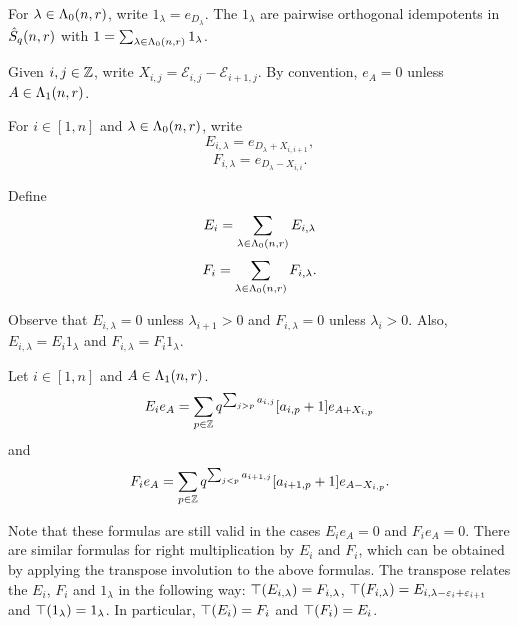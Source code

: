 \documentclass[a4paper, 11pt]{report}
\begin{document}
For $\lambda\in\Lambda_0(n,r)$, write $1_\lambda = e_{D_\lambda}$. The $1_\lambda$ are pairwise orthogonal idempotents in $\hat{S}_q(n,r)$ with $1 = \sum_{\lambda\in\Lambda_0(n,r)}1_\lambda$.

Given $i,j\in\mathbb{Z}$, write $X_{i,j} = \mathcal{E}_{i,j} - \mathcal{E}_{i+1,j}$. By convention, $e_A = 0$ unless $A\in\Lambda_1(n,r)$.

For $i\in [1,n]$ and $\lambda\in\Lambda_0(n,r)$, write
\begin{equation*}
E_{i,\lambda} = e_{D_\lambda + X_{i,i+1}},
\end{equation*}
\begin{equation*}
F_{i,\lambda} = e_{D_\lambda - X_{i,i}}.
\end{equation*}

Define
\begin{equation*}
E_i = \sum_{\lambda\in\Lambda_0(n,r)} E_{i,\lambda}
\end{equation*}
\begin{equation*}
F_i = \sum_{\lambda\in\Lambda_0(n,r)} F_{i,\lambda}.
\end{equation*}

Observe that $E_{i,\lambda}=0$ unless $\lambda_{i+1} > 0$ and $F_{i,\lambda}=0$ unless $\lambda_i > 0$. Also, $E_{i,\lambda} = E_i 1_\lambda$ and $F_{i,\lambda} = F_i 1_\lambda$. 
\begin{lemma}
Let $i\in [1,n]$ and $A\in\Lambda_1(n,r)$.
\begin{equation*}
E_ie_A = \sum_{p\in\mathbb{Z}} q^{\sum_{j>p} a_{i,j}}[a_{i,p}+1] e_{A + X_{i,p}}
\end{equation*}
and
\begin{equation*}                                                                               
F_ie_A = \sum_{p\in\mathbb{Z}} q^{\sum_{j<p} a_{i+1,j}}[a_{i+1,p}+1] e_{A - X_{i,p}}.
\end{equation*}
\end{lemma}

Note that these formulas are still valid in the cases $E_ie_A=0$ and $F_ie_A=0$. There are similar formulas for right multiplication by $E_i$ and $F_i$, which can be obtained by applying the transpose involution to the above formulas. The transpose relates the $E_i$, $F_i$ and $1_\lambda$ in the following way: $\top(E_{i,\lambda}) = F_{i,\lambda}$, $\top(F_{i,\lambda}) = E_{i,\lambda -\varepsilon_i +\varepsilon_{i+1}}$ and $\top(1_\lambda) = 1_\lambda$. In particular, $\top(E_i) = F_i$ and $\top(F_i) = E_i$.
\end{document}
